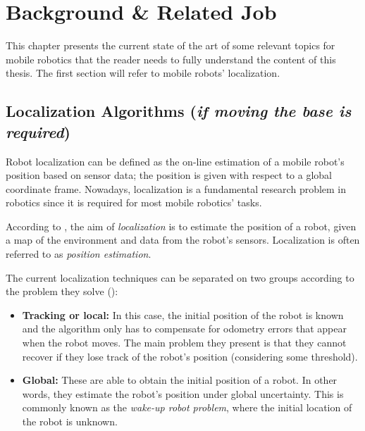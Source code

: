 

\chapter{Background \&  Related Job}


This chapter presents the current state of the art of some relevant topics for mobile robotics that the reader needs to fully understand the content of this thesis. The first section will refer to mobile robots' localization.

\section{Localization Algorithms (\textit{if moving the base is required})}

Robot localization can be defined as the on-line estimation of a mobile robot's position based on sensor data; the position is given with respect to a global coordinate frame. Nowadays, localization is a fundamental research problem in robotics since it is required for most mobile robotics' tasks.

According to \citet{Markov}, the aim of \textit{localization} is to estimate the position of a robot, given a map of the environment and data from the robot's sensors. Localization is often referred to as \textit{position estimation}.

The current localization techniques can be separated on two groups according to the problem they solve (\citep{Markov}):
\begin{itemize}
	\item \textbf{Tracking or local:} In this case, the initial position of the robot is known and the algorithm only has to compensate for odometry errors that appear when the robot moves. The main problem they present is that they cannot recover if they lose track of the robot's position (considering some threshold).
	\item \textbf{Global:} These are able to obtain the initial position of a robot. In other words, they estimate the robot's position under global uncertainty. This is commonly known as the \textit{wake-up robot problem}, where the initial location of the robot is unknown.
\end{itemize}

